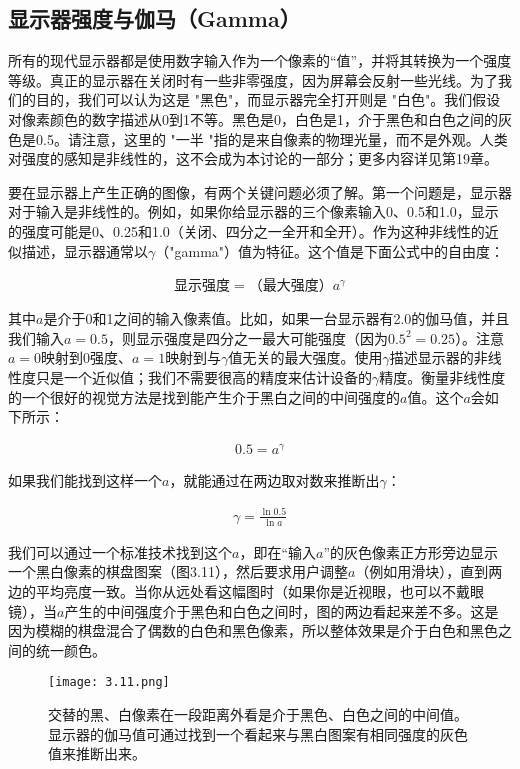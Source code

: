 \documentclass[lang=cn,12pt]{elegantbook}
\begin{document}
\subsection{显示器强度与伽马（Gamma）}

所有的现代显示器都是使用数字输入作为一个像素的“值”，并将其转换为一个强度等级。真正的显示器在关闭时有一些非零强度，因为屏幕会反射一些光线。为了我们的目的，我们可以认为这是 "黑色"，而显示器完全打开则是 "白色"。我们假设对像素颜色的数字描述从0到1不等。黑色是0，白色是1，介于黑色和白色之间的灰色是0.5。请注意，这里的 "一半 "指的是来自像素的物理光量，而不是外观。人类对强度的感知是非线性的，这不会成为本讨论的一部分；更多内容详见第19章。

要在显示器上产生正确的图像，有两个关键问题必须了解。第一个问题是，显示器对于输入是非线性的。例如，如果你给显示器的三个像素输入0、0.5和1.0，显示的强度可能是0、0.25和1.0（关闭、四分之一全开和全开）。作为这种非线性的近似描述，显示器通常以$\gamma $（"gamma"）值为特征。这个值是下面公式中的自由度：

\begin{align}
  \mbox{显示强度}=\mbox{（最大强度）}a^\gamma
\end{align}

其中$a$是介于0和1之间的输入像素值。比如，如果一台显示器有2.0的伽马值，并且我们输入$a=0.5$，则显示强度是四分之一最大可能强度（因为$0.5^2=0.25$）。注意$a=0$映射到0强度、$a=1$映射到与$\gamma$值无关的最大强度。使用$\gamma$描述显示器的非线性度只是一个近似值；我们不需要很高的精度来估计设备的$\gamma$精度。衡量非线性度的一个很好的视觉方法是找到能产生介于黑白之间的中间强度的$a$值。这个$a$会如下所示：

\[
  \begin{aligned}
  0.5 = a^\gamma 
  \end{aligned}
\]

如果我们能找到这样一个$a$，就能通过在两边取对数来推断出$\gamma$：

\[
  \begin{aligned}
  \gamma = \frac{\ln 0.5}{\ln a} 
  \end{aligned}
\]

我们可以通过一个标准技术找到这个$a$，即在“输入$a$”的灰色像素正方形旁边显示一个黑白像素的棋盘图案（图3.11），然后要求用户调整$a$（例如用滑块），直到两边的平均亮度一致。当你从远处看这幅图时（如果你是近视眼，也可以不戴眼镜），当$a$产生的中间强度介于黑色和白色之间时，图的两边看起来差不多。这是因为模糊的棋盘混合了偶数的白色和黑色像素，所以整体效果是介于白色和黑色之间的统一颜色。

\begin{figure}[htb]
  \centering
  \texttt{[image: 3.11.png]}
  \caption{交替的黑、白像素在一段距离外看是介于黑色、白色之间的中间值。显示器的伽马值可通过找到一个看起来与黑白图案有相同强度的灰色值来推断出来。}
\end{figure}
\end{document}
